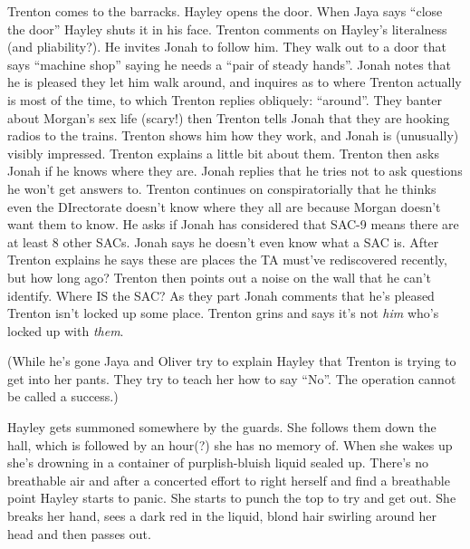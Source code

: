 

Trenton comes to the barracks.  Hayley opens the door.  When Jaya says ``close the door'' Hayley shuts it in his face.  Trenton comments on Hayley's literalness (and pliability?).  He invites Jonah to follow him.  They walk out to a door that says ``machine shop'' saying he needs a ``pair of steady hands''.  Jonah notes that he is pleased they let him walk around, and inquires as to where Trenton actually is most of the time, to which Trenton replies obliquely: ``around''.  They banter about Morgan's sex life (scary!) then Trenton tells Jonah that they are hooking radios to the trains.  Trenton shows him how they work, and Jonah is (unusually) visibly impressed.  Trenton explains a little bit about them.  Trenton then asks Jonah if he knows where they are.  Jonah replies that he tries not to ask questions he won't get answers to.  Trenton continues on conspiratorially that he thinks even the DIrectorate doesn't know where they all are because Morgan doesn't want them to know.  He asks if Jonah has considered that SAC-9 means there are at least 8 other SACs.  Jonah says he doesn't even know what a SAC is.  After Trenton explains he says these are places the TA must've rediscovered recently, but how long ago? Trenton then points out a noise on the wall that he can't identify.  Where IS the SAC?  As they part Jonah comments that he's pleased Trenton isn't locked up some place.  Trenton grins and says it's not \textit{him} who's locked up with \textit{them}.



(While he's gone Jaya and Oliver try to explain Hayley that Trenton is trying to get into her pants.  They try to teach her how to say ``No''.  The operation cannot be called a success.)




Hayley gets summoned somewhere by the guards.   She follows them down the hall, which is  followed by an hour(?) she has no memory of.  When she wakes up she's drowning in a container of purplish-bluish liquid sealed up. There's no breathable air and after a concerted effort to right herself and find a breathable point Hayley starts to panic.  She starts to punch the top to try and get out.  She breaks her hand, sees a dark red in the liquid, blond hair swirling around her head and then passes out.



